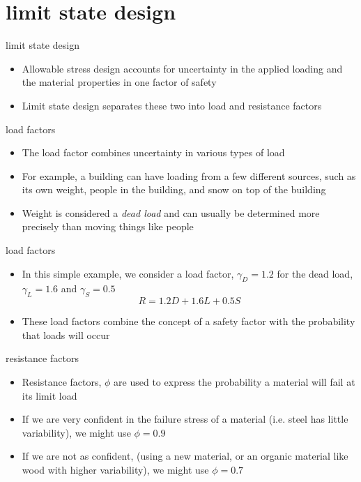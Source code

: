 \documentclass[
  letterpaper,
  ignorenonframetext,
  aspectratio=43,
  handout,
  12pt]{beamer}
\providecommand{\tightlist}{%
  \setlength{\itemsep}{0pt}\setlength{\parskip}{0pt}}
\providecommand{\tightlist}{%
\setlength{\itemsep}{0pt}\setlength{\parskip}{0pt}}
\begin{document}
\hypertarget{limit-state-design}{%
\section{limit state design}\label{limit-state-design}}

\begin{frame}{limit state design}
\protect\hypertarget{limit-state-design-1}{}
\begin{itemize}
\tightlist
\item
  Allowable stress design accounts for uncertainty in the applied
  loading and the material properties in one factor of safety
\item
  Limit state design separates these two into load and resistance
  factors
\end{itemize}
\end{frame}

\begin{frame}{load factors}
\protect\hypertarget{load-factors}{}
\begin{itemize}
\tightlist
\item
  The load factor combines uncertainty in various types of load
\item
  For example, a building can have loading from a few different sources,
  such as its own weight, people in the building, and snow on top of the
  building
\item
  Weight is considered a \emph{dead load} and can usually be determined
  more precisely than moving things like people
\end{itemize}
\end{frame}

\begin{frame}{load factors}
\protect\hypertarget{load-factors-1}{}
\begin{itemize}
\item
  In this simple example, we consider a load factor, \(\gamma_D=1.2\)
  for the dead load, \(\gamma_L=1.6\) and \(\gamma_S=0.5\)
  \[R = 1.2D + 1.6L + 0.5S\]
\item
  These load factors combine the concept of a safety factor with the
  probability that loads will occur
\end{itemize}
\end{frame}

\begin{frame}{resistance factors}
\protect\hypertarget{resistance-factors}{}
\begin{itemize}
\item
  Resistance factors, \(\phi\) are used to express the probability a
  material will fail at its limit load
\item
  If we are very confident in the failure stress of a material (i.e.
  steel has little variability), we might use \(\phi=0.9\)
\item
  If we are not as confident, (using a new material, or an organic
  material like wood with higher variability), we might use \(\phi=0.7\)
\end{itemize}
\end{frame}
\end{document}
